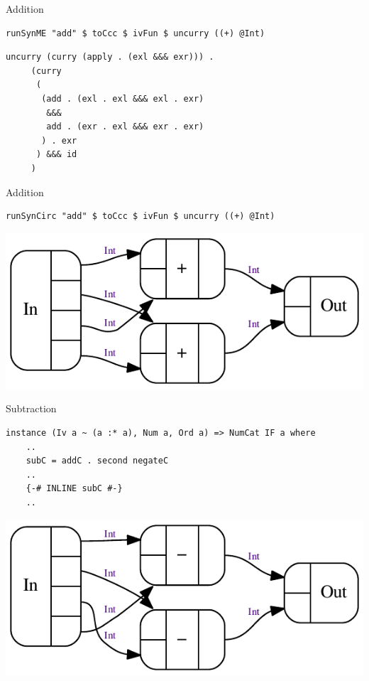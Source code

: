 \documentclass[10pt]{beamer}
\theoremstyle{definition}
\theoremstyle{remark}
\numberwithin{equation}{section}
\begin{document}
\begin{frame}[fragile]{Addition}
  \begin{lstlisting}[frame=single]
    runSynME "add" $ toCcc $ ivFun $ uncurry ((+) @Int)
  \end{lstlisting}
  \begin{lstlisting}[frame=single]
     uncurry (curry (apply . (exl &&& exr))) .
     (curry
      (
       (add . (exl . exl &&& exl . exr)
        &&&
        add . (exr . exl &&& exr . exr)
       ) . exr
      ) &&& id
     )
  \end{lstlisting}
\end{frame}

\begin{frame}[fragile]{Addition}
  \begin{lstlisting}[frame=single]
    runSynCirc "add" $ toCcc $ ivFun $ uncurry ((+) @Int)
  \end{lstlisting}
  \includegraphics{add-iv.pdf}
\end{frame}

\begin{frame}[fragile]{Subtraction}
  \begin{lstlisting}[frame=single]
  instance (Iv a ~ (a :* a), Num a, Ord a) => NumCat IF a where
    ..
    subC = addC . second negateC
    ..
    {-# INLINE subC #-}
    ..
  \end{lstlisting}
  \includegraphics{sub-iv.pdf}
\end{frame}
\end{document}
